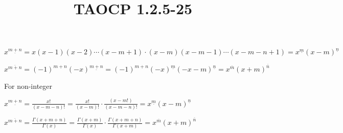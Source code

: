 \documentclass{article}
\title{TAOCP 1.2.5\mbox{-}25}
\begin{document}
\maketitle

\( x^{\underline{m+n}} = x(x-1)(x-2)\cdots(x-m+1)\cdot(x-m)(x-m-1)\cdots(x-m-n+1) = x^{\underline{m}}{(x-m)}^{\underline{n}} \)

\( x^{\overline{m+n}} = {(-1)}^{m+n}{(-x)}^{\underline{m+n}} = {(-1)}^{m+n}{(-x)}^{\underline{m}}{(-x-m)}^{\underline{n}} = x^{\overline{m}} {(x+m)}^{\overline{n}} \)

For non-integer

\( x^{\underline{m+n}} = \frac{x!}{(x-m-n)!} = \frac{x!}{(x-m)!} \cdot \frac{(x-m!)}{(x-m-n)!} = x^{\underline{m}}{(x-m)}^{\underline{n}} \)

\( x^{\overline{m+n}} = \frac{\Gamma(x + m + n)}{\Gamma(x)} = \frac{\Gamma(x+m)}{\Gamma(x)} \cdot \frac{\Gamma(x+m+n)}{\Gamma(x+m)} = x^{\overline{m}} {(x+m)}^{\overline{n}} \)
\end{document}
